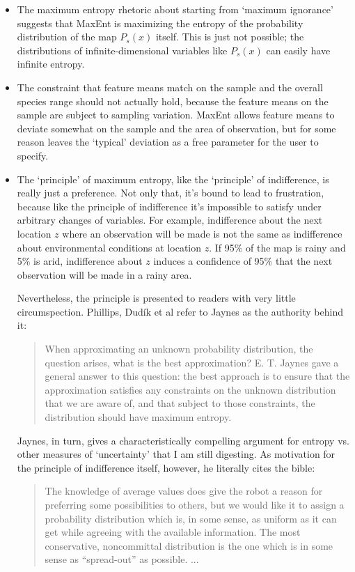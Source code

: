 \begin{itemize}
    \item The maximum entropy rhetoric about starting from `maximum ignorance' suggests that MaxEnt is maximizing the entropy of the probability distribution of the map $P_s(x)$ itself. This is just not possible; the distributions of infinite-dimensional variables like $P_s(x)$ can easily have infinite entropy.
    \item The constraint that feature means match on the sample and the overall species range should not actually hold, because the feature means on the sample are subject to sampling variation. MaxEnt allows feature means to deviate somewhat on the sample and the area of observation, but for some reason leaves the `typical' deviation as a free parameter for the user to specify.
    \item The `principle' of maximum entropy, like the `principle' of indifference, is really just a preference. Not only that, it's bound to lead to frustration, because like the principle of indifference it's impossible to satisfy under arbitrary changes of variables. For example, indifference about the next location $z$ where an observation will be made is not the same as indifference about environmental conditions at location $z$. If 95\% of the map is rainy and 5\% is arid, indifference about $z$ induces a confidence of 95\% that the next observation will be made in a rainy area.
    
    Nevertheless, the principle is presented to readers with very little circumspection. Phillips, Dud\'ik et al \cite{Phillips:2004p11403,Phillips:2006p11404,Phillips:2008p12219} refer to Jaynes \cite{Jaynes:ch11} as the authority behind it:
    \begin{quote}
        When approximating an unknown probability distribution, the question arises, what is the best approximation? E. T. Jaynes gave a general answer to this question: the best approach is to ensure that the approximation satisfies any constraints on the unknown distribution that we are aware of, and that subject to those constraints, the distribution should have maximum entropy.
    \end{quote} 
Jaynes, in turn, gives a characteristically compelling argument for entropy vs. other measures of `uncertainty' that I am still digesting. As motivation for the principle of indifference itself, however, he literally cites the bible:
\begin{quote}
    The knowledge of average values does give the robot a reason for preferring some possibilities to others, but we would like it to assign a probability distribution which is, in some sense, as uniform as it can get while agreeing with the available information. The most conservative, noncommittal distribution is the one which is in some sense as ``spread-out'' as possible. ...
    

\end{quote}
\end{itemize}
